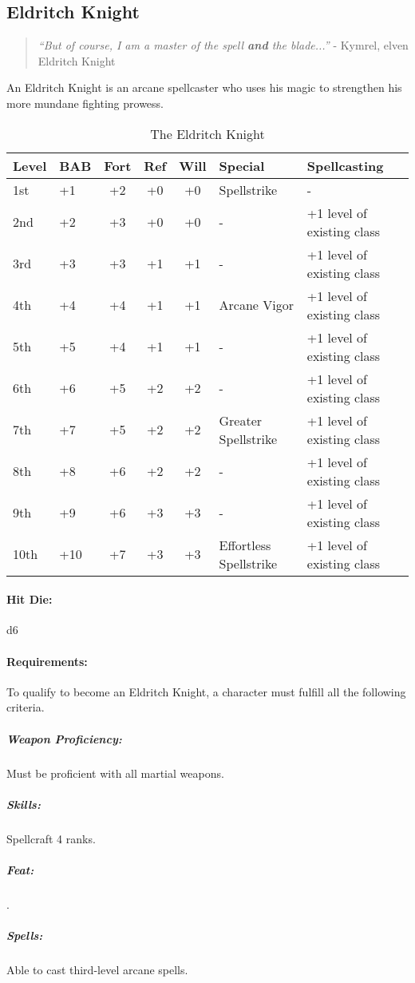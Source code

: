 \subsection{Eldritch Knight}
\begin{quote}
\emph{``But of course, I am a master of the spell \textbf{and} the blade...''}
- Kymrel, elven Eldritch Knight
\end{quote}
An Eldritch Knight is an arcane spellcaster who uses his magic to strengthen his more mundane fighting prowess.

\begin{table*}
\centering
\caption{The Eldritch Knight}
\label{tab:EldritchKnight}
\begin{tabular}{|l|l|c|c|c|l|l|}
\hline
\textbf{Level}&\textbf{BAB}&\textbf{Fort}&\textbf{Ref}&\textbf{Will}&\textbf{Special}&\textbf{Spellcasting}\\
\hline
1st	&+1	&+2	&+0	&+0	&Spellstrike		&-\\
2nd	&+2	&+3	&+0	&+0	&-			&+1 level of existing class\\
3rd	&+3	&+3	&+1	&+1	&-			&+1 level of existing class\\
4th	&+4	&+4	&+1	&+1	&Arcane Vigor		&+1 level of existing class\\
5th	&+5	&+4	&+1	&+1	&-			&+1 level of existing class\\
6th	&+6	&+5	&+2	&+2	&-			&+1 level of existing class\\
7th	&+7	&+5	&+2	&+2	&Greater Spellstrike	&+1 level of existing class\\
8th	&+8	&+6	&+2	&+2	&-			&+1 level of existing class\\
9th	&+9	&+6	&+3	&+3	&-			&+1 level of existing class\\
10th	&+10	&+7	&+3	&+3	&Effortless Spellstrike	&+1 level of existing class\\
\hline
\end{tabular}
\end{table*}

\paragraph{Hit Die:} d6
\paragraph{Requirements:}
To qualify to become an Eldritch Knight, a character must fulfill all the following criteria.
\subparagraph{Weapon Proficiency:} Must be proficient with all martial weapons.
\subparagraph{Skills:} Spellcraft 4 ranks.
\subparagraph{Feat:} .
\subparagraph{Spells:} Able to cast third-level arcane spells.
